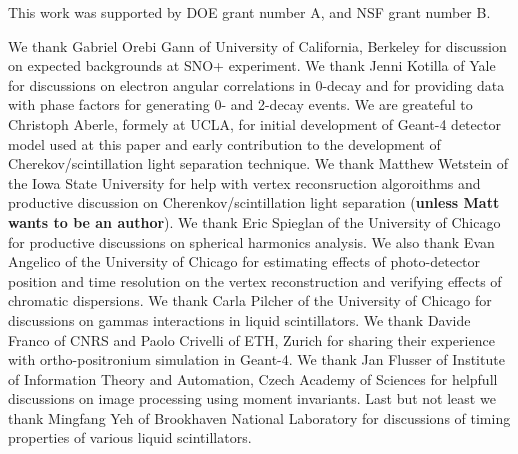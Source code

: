 This work was supported by DOE grant number A, and NSF grant number B.

We thank Gabriel Orebi Gann of University of California, Berkeley for discussion on expected backgrounds at 
SNO+ experiment. We thank Jenni Kotilla of Yale for discussions on electron angular correlations in 0\nbb-decay 
and for providing data with phase factors for generating 0\nbb- and 2\nbb-decay events.
We are greateful to Christoph Aberle, formely at UCLA, for initial development of Geant-4 
detector model used at this paper and early contribution to the development of Cherekov/scintillation
light separation technique. We thank Matthew Wetstein of the Iowa State University for help with vertex reconsruction
algoroithms and productive discussion on Cherenkov/scintillation light separation (\textbf{unless Matt wants to be
an author}). We thank Eric Spieglan of the University of Chicago for productive discussions on spherical harmonics
analysis. We also thank Evan Angelico of the University of Chicago for estimating effects of photo-detector position and
time resolution on the vertex reconstruction and verifying effects of chromatic dispersions. We thank Carla Pilcher of 
the University of Chicago for discussions on gammas interactions in liquid scintillators.
We thank Davide Franco of CNRS and Paolo Crivelli of ETH, Zurich for sharing their experience with ortho-positronium 
simulation in Geant-4. We thank Jan Flusser of Institute of Information Theory and Automation, Czech Academy of Sciences for
helpfull discussions on image processing using moment invariants. Last but not least we thank Mingfang Yeh of 
Brookhaven National Laboratory for discussions of timing properties of various liquid scintillators.
